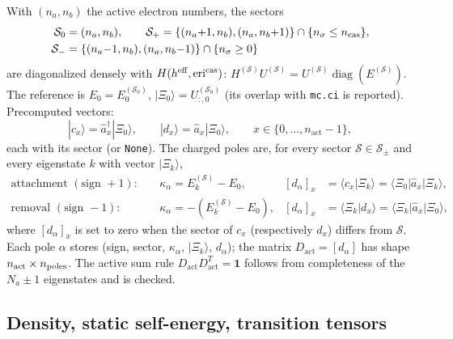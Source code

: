 \documentclass[11pt,a4paper]{article}
\newcommand{\ket}[1]{|#1\rangle}
\newcommand{\braket}[1]{\langle#1\rangle}
\newcommand{\code}[1]{\texttt{#1}}
\newcommand{\act}{\mathrm{act}}
\begin{document}
With $(n_a,n_b)$ the active electron numbers, the sectors
\begin{align}
  \mathcal S_0&=(n_a,n_b),\qquad
  \mathcal S_+=\{(n_a{+}1,n_b),(n_a,n_b{+}1)\}\cap\{n_\sigma\le n_{\rm cas}\},
  \label{eq:sectors}\\
  \mathcal S_-&=\{(n_a{-}1,n_b),(n_a,n_b{-}1)\}\cap\{n_\sigma\ge0\}\nonumber
\end{align}
are diagonalized densely with $H(h^{\rm eff},\mathrm{eri}^{\rm cas})$:
$H^{(\mathcal S)}U^{(\mathcal S)}=U^{(\mathcal S)}\operatorname{diag}(E^{(\mathcal S)})$.
The reference is $E_0=E^{(\mathcal S_0)}_0$, $\ket{\Xi_0}=U^{(\mathcal S_0)}_{:,0}$
(its overlap with \code{mc.ci} is reported).  Precomputed vectors:
\begin{equation}
  \ket{c_x}=\hat a_x^\dagger\ket{\Xi_0},\qquad \ket{d_x}=\hat a_x\ket{\Xi_0},\qquad x\in\{0,\ldots,n_{\act}-1\},
  \label{eq:cd}
\end{equation}
each with its sector (or \code{None}).  The charged poles are, for every
sector $\mathcal S\in\mathcal S_\pm$ and every eigenstate $k$ with vector
$\ket{\Xi_k}$,
\begin{align}
  \text{attachment }(\text{sign }+1):\quad&\kappa_\alpha=E^{(\mathcal S)}_k-E_0,&
  [d_\alpha]_x&=\braket{c_x|\Xi_k}=\braket{\Xi_0|\hat a_x|\Xi_k},
  \label{eq:pole-att}\\
  \text{removal }(\text{sign }-1):\quad&\kappa_\alpha=-(E^{(\mathcal S)}_k-E_0),&
  [d_\alpha]_x&=\braket{\Xi_k|d_x}=\braket{\Xi_k|\hat a_x|\Xi_0},
  \label{eq:pole-rem}
\end{align}
where $[d_\alpha]_x$ is set to zero when the sector of $c_x$ (respectively
$d_x$) differs from $\mathcal S$.  Each pole $\alpha$ stores (sign, sector, $\kappa_\alpha$, $\ket{\Xi_k}$,
$d_\alpha$); the matrix $D_{\act}=[d_\alpha]$ has shape $n_{\act}\times n_{\rm poles}$.
The active sum rule $D_{\act}D_{\act}^{T}=\mathbf 1$ follows from completeness
of the $N_a\pm1$ eigenstates and is checked.

\subsection{Density, static self-energy, transition tensors}
\end{document}

